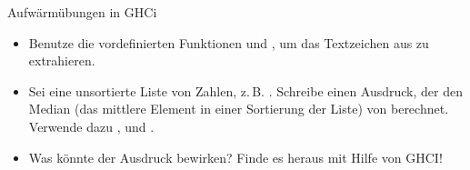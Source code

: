\documentclass{uebblatt}
\begin{document}

\begin{aufgabe}{Aufwärmübungen in GHCi}
  \begin{itemize}
    \item Benutze die vordefinierten Funktionen  und , um das Textzeichen aus  zu extrahieren.
    \item Sei  eine unsortierte Liste von Zahlen, z.\,B. . Schreibe einen Ausdruck, der den Median (das mittlere Element in einer Sortierung der Liste) von  berechnet. Verwende dazu ,  und \haskellinline{!!}.
    \item Was könnte der Ausdruck  bewirken? Finde es heraus mit Hilfe von GHCI!
  \end{itemize}
\end{aufgabe}
\end{document}
